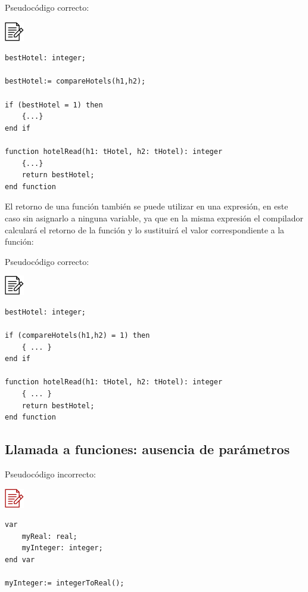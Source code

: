 \documentclass[
]{book}
\begin{document}
Pseudocódigo correcto:

\includegraphics{./img/alg.png}

\begin{verbatim}
bestHotel: integer;

bestHotel:= compareHotels(h1,h2);

if (bestHotel = 1) then
    {...}
end if  

function hotelRead(h1: tHotel, h2: tHotel): integer
    {...}
    return bestHotel;
end function
\end{verbatim}

El retorno de una función también se puede utilizar en una expresión, en este caso sin asignarlo a ninguna variable, ya que en la misma expresión el compilador calculará el retorno de la función y lo sustituirá el valor correspondiente a la función:

Pseudocódigo correcto:

\includegraphics{./img/alg.png}

\begin{verbatim}
bestHotel: integer;

if (compareHotels(h1,h2) = 1) then
    { ... }
end if  

function hotelRead(h1: tHotel, h2: tHotel): integer
    { ... }
    return bestHotel;
end function
\end{verbatim}

\hypertarget{llamada-a-funciones-ausencia-de-paruxe1metros}{%
\subsection{Llamada a funciones: ausencia de parámetros}\label{llamada-a-funciones-ausencia-de-paruxe1metros}}

Pseudocódigo incorrecto:

\includegraphics{./img/alg_err.png}

\begin{verbatim}
var
    myReal: real;
    myInteger: integer;
end var

myInteger:= integerToReal();
\end{verbatim}
\end{document}
